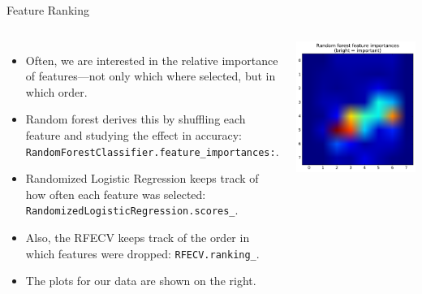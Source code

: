 \documentclass[10pt, aspectratio=169]{beamer} %
\begin{document}
\begin{frame}[fragile]{Feature Ranking}
\begin{columns}
\begin{itemize}
	\item Often, we are interested in the relative importance of features---not only which where selected, but in which order.
	\item Random forest derives this by shuffling each feature and studying the effect in accuracy: \verb+RandomForestClassifier.feature_importances:+.
	\item Randomized Logistic Regression keeps track of how often each feature was selected: \verb+RandomizedLogisticRegression.scores_+.
	\item Also, the RFECV keeps track of the order in which features were dropped: \verb+RFECV.ranking_+.
	\item The plots for our data are shown on the right.
\end{itemize}
\begin{center}
\includegraphics[width=\columnwidth]{RF_ranking.pdf}\\

\end{center}
\end{columns}
\end{frame}
\end{document}
